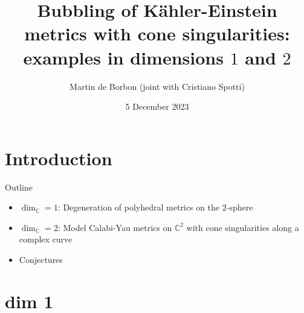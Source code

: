 \documentclass{beamer}
\title[]{Bubbling of K\"ahler-Einstein metrics with cone singularities: examples in dimensions \(1\) and \(2\)}
\author[Martin de Borbon]{Martin de Borbon (joint with Cristiano Spotti)}
\institute[Loughborough]{Seminar at Tsinghua University}
\date{5 December 2023}
\newcommand{\C}{\mathbb{C}}
\begin{document}
\begin{frame}
  \titlepage
\end{frame}


\section{Introduction}

\begin{frame}{Outline}
	\begin{itemize}
		\setlength{\itemsep}{\fill}
		\pause
		\item \(\dim_{\C} = 1\): Degeneration of polyhedral metrics on the \(2\)-sphere
		
		\pause
		\item \(\dim_{\C} = 2\): Model Calabi-Yau metrics on \(\C^2\) with cone singularities along a complex curve  
		
		\pause
		\item Conjectures
	\end{itemize}
\end{frame}

\section{dim 1}
\end{document}

